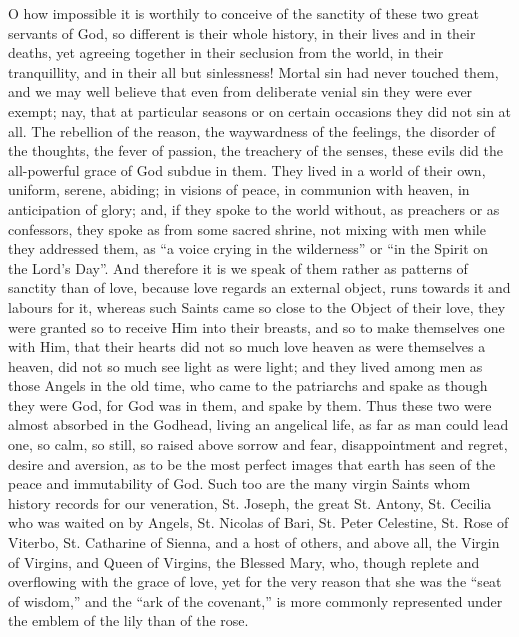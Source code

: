 O how impossible it is worthily to conceive of the sanctity of
these two great servants of God, so different is their whole history,
in their lives and in their deaths, yet agreeing together in their
seclusion from the world, in their tranquillity, and in their all but
sinlessness! Mortal sin had never touched them, and we may well
believe that even from deliberate venial sin they were ever exempt;
nay, that at particular seasons or on certain occasions they did not
sin at all. The rebellion of the reason, the waywardness of the
feelings, the disorder of the thoughts, the fever of passion, the
treachery of the senses, these evils did the all-powerful grace of God
subdue in them. They lived in a world of their own, uniform, serene,
abiding; in visions of peace, in communion with heaven, in
anticipation of glory; and, if they spoke to the world without, as
preachers or as confessors, they spoke as from some sacred shrine, not
mixing with men while they addressed them, as ``a voice crying in
the wilderness'' or ``in the Spirit on the Lord's Day''.
And therefore it is we speak of them rather as patterns of sanctity
than of love, because love regards an external object, runs towards it
and labours for it, whereas such Saints came so close to the Object of
their love, they were granted so to receive Him into their breasts,
and so to make themselves one with Him, that their hearts did not so
much love heaven as were themselves a heaven, did not so much see
light as were light; and they lived among men as those Angels in the
old time, who came to the patriarchs and spake as though they were
God, for God was in them, and spake by them. Thus these two were
almost absorbed in the Godhead, living an angelical life, as far as
man could lead one, so calm, so still, so raised above sorrow and
fear, disappointment and regret, desire and aversion, as to be the
most perfect images that earth has seen of the peace and immutability
of God. Such too are the many virgin Saints whom history records for
our veneration, St. Joseph, the great St. Antony, St. Cecilia who was
waited on by Angels, St. Nicolas of Bari, St. Peter Celestine, St.
Rose of Viterbo, St. Catharine of Sienna, and a host of others, and
above all, the Virgin of Virgins, and Queen of Virgins, the Blessed
Mary, who, though replete and overflowing with the grace of love, yet
for the very reason that she was the ``seat of wisdom,'' and
the ``ark of the covenant,'' is more commonly represented
under the emblem of the lily than of the rose.

